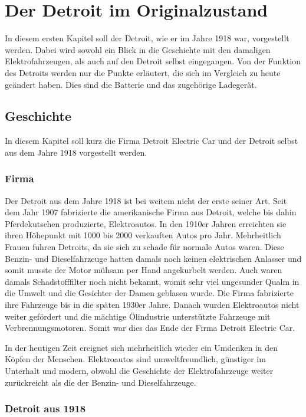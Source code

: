 \chapter{Der Detroit im Originalzustand}
In diesem ersten Kapitel soll der Detroit, wie er im Jahre 1918 war, vorgestellt werden. Dabei wird sowohl ein Blick in die Geschichte mit den damaligen Elektrofahrzeugen, als auch auf den Detroit selbst eingegangen. Von der Funktion des Detroits werden nur die Punkte erläutert, die sich im Vergleich zu heute geändert haben. Dies sind die Batterie und das zugehörige Ladegerät.

\section{Geschichte}

In diesem Kapitel soll kurz die Firma Detroit Electric Car und der Detroit selbst aus dem Jahre 1918 vorgestellt werden.

\subsection{Firma}

Der Detroit aus dem Jahre 1918 ist bei weitem nicht der erste seiner Art. Seit dem Jahr 1907 fabrizierte die amerikanische Firma aus Detroit, welche bis dahin Pferdekutschen produzierte, Elektroautos. In den 1910er Jahren erreichten sie ihren Höhepunkt mit 1000 bis 2000 verkauften Autos pro Jahr. Mehrheitlich Frauen fuhren Detroits, da sie sich zu schade für normale Autos waren. Diese Benzin- und Dieselfahrzeuge hatten damals noch keinen elektrischen Anlasser und somit musste der Motor mühsam per Hand angekurbelt werden. Auch waren damals Schadstofffilter noch nicht bekannt, womit sehr viel ungesunder Qualm in die Umwelt und die Gesichter der Damen geblasen wurde. Die Firma fabrizierte ihre Fahrzeuge bis in die späten 1930er Jahre. Danach wurden Elektroautos nicht weiter gefördert und die mächtige Ölindustrie unterstützte Fahrzeuge mit Verbrennungsmotoren. Somit war dies das Ende der Firma Detroit Electric Car.

In der heutigen Zeit ereignet sich mehrheitlich wieder ein Umdenken in den Köpfen der Menschen. Elektroautos sind umweltfreundlich, günstiger im Unterhalt und modern, obwohl die Geschichte der Elektrofahrzeuge weiter zurückreicht als die der Benzin- und Dieselfahrzeuge.

\subsection{Detroit aus 1918}

